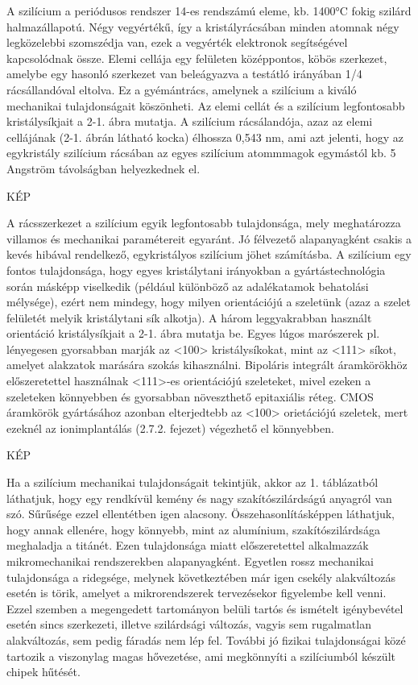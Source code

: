 \documentclass{article}
\begin{document}
A szilícium a periódusos rendszer 14-es rendszámú eleme, kb. 1400°C fokig szilárd
halmazállapotú. Négy vegyértékű, így a kristályrácsában minden atomnak négy legközelebbi
szomszédja van, ezek a vegyérték elektronok segítségével kapcsolódnak össze. Elemi
cellája egy felületen középpontos, köbös szerkezet, amelybe egy hasonló szerkezet van
beleágyazva a testátló irányában 1/4 rácsállandóval eltolva. Ez a gyémántrács, amelynek a
szilícium a kiváló mechanikai tulajdonságait köszönheti. Az elemi cellát és a szilícium
legfontosabb kristálysíkjait a 2-1. ábra mutatja. A szilícium rácsálandója, azaz az elemi
cellájának (2-1. ábrán látható kocka) élhossza 0,543 nm, ami azt jelenti, hogy az egykristály
szilícium rácsában az egyes szilícium atommmagok egymástól kb. 5 Angström távolságban
helyezkednek el. 

KÉP

A rácsszerkezet a szilícium egyik legfontosabb tulajdonsága, mely meghatározza villamos
és mechanikai paramétereit egyaránt. Jó félvezető alapanyagként csakis a kevés hibával
rendelkező, egykristályos szilícium jöhet számításba. A szilícium egy fontos tulajdonsága,
hogy egyes kristálytani irányokban a gyártástechnológia során másképp viselkedik (például
különböző az adalékatamok behatolási mélysége), ezért nem mindegy, hogy milyen
orientációjú a szeletünk (azaz a szelet felületét melyik kristálytani sík alkotja). A három
leggyakrabban használt orientáció kristálysíkjait a 2-1. ábra mutatja be. Egyes lúgos
marószerek pl. lényegesen gyorsabban marják az <100> kristálysíkokat, mint az <111>
síkot, amelyet alakzatok marására szokás kihasználni. Bipoláris integrált áramkörökhöz
előszeretettel használnak <111>-es orientációjú szeleteket, mivel ezeken a szeleteken
könnyebben és gyorsabban növeszthető epitaxiális réteg. CMOS áramkörök gyártásához
azonban elterjedtebb az <100> orietációjú szeletek, mert ezeknél az ionimplantálás (2.7.2.
fejezet) végezhető el könnyebben. 

KÉP

Ha a szilícium mechanikai tulajdonságait tekintjük, akkor az 1. táblázatból láthatjuk, hogy
egy rendkívül kemény és nagy szakítószilárdságú anyagról van szó. Sűrűsége ezzel
ellentétben igen alacsony. Összehasonlításképpen láthatjuk, hogy annak ellenére, hogy
könnyebb, mint az alumínium, szakítószilárdsága meghaladja a titánét. Ezen tulajdonsága
miatt előszeretettel alkalmazzák mikromechanikai rendszerekben alapanyagként. Egyetlen
rossz mechanikai tulajdonsága a ridegsége, melynek következtében már igen csekély
alakváltozás esetén is törik, amelyet a mikrorendszerek tervezésekor figyelembe kell venni.
Ezzel szemben a megengedett tartományon belüli tartós és ismételt igénybevétel esetén
sincs szerkezeti, illetve szilárdsági változás, vagyis sem rugalmatlan alakváltozás, sem
pedig fáradás nem lép fel. További jó fizikai tulajdonságai közé tartozik a viszonylag magas
hővezetése, ami megkönnyíti a szilíciumból készült chipek hűtését. 
\end{document}
